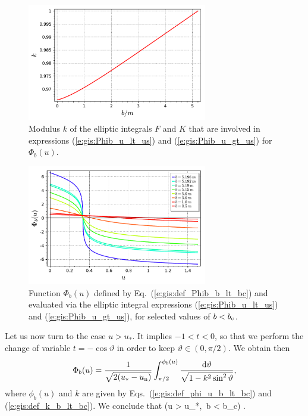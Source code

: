 \begin{figure}
\centerline{\includegraphics[width=0.7\textwidth]{gis_k_b_lt_bc.pdf}}
\caption[]{\label{f:gis:k_b_lt_bc} \footnotesize
Modulus $k$ of the elliptic integrals $F$ and $K$ that are involved
in expressions (\ref{e:gis:Phib_u_lt_us}) and (\ref{e:gis:Phib_u_gt_us})
for $\Phi_b(u)$.}
\end{figure}

\begin{figure}
\centerline{\includegraphics[width=0.7\textwidth]{gis_Phib_b_lt_bc.pdf}}
\caption[]{\label{f:gis:Phib_b_lt_bc} \footnotesize
Function $\Phi_b(u)$ defined by Eq.~(\ref{e:gis:def_Phib_b_lt_bc}) and
evaluated via the elliptic integral expressions (\ref{e:gis:Phib_u_lt_us})
and (\ref{e:gis:Phib_u_gt_us}),
for selected values of $b < b_{\rm c}$.}
\end{figure}

Let us now turn to the case $u>u_*$. It implies $-1 < t < 0$, so that
we perform the change of variable $t = -\cos\vartheta$ in order to keep
$\vartheta\in(0,\pi/2)$. We obtain then
\[
    \Phi_b(u) =  \frac{1}{\sqrt{2(u_* - u_{\rm n})}} \int_{\pi/2}^{\phi_b(u)}
        \frac{\mathrm{d}\vartheta}{\sqrt{1 - k^2 \sin^2\vartheta}} ,
\]
where $\phi_b(u)$ and $k$ are given by Eqs.~(\ref{e:gis:def_phi_u_b_lt_bc})
and (\ref{e:gis:def_k_b_lt_bc}). We conclude that
\be \label{e:gis:Phib_u_gt_us}
    \qquad (u > u_*,\ b < b_{\rm c}) .
\ee


